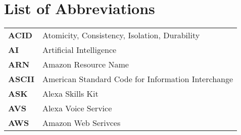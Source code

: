 \section*{List of Abbreviations}
\begin{flushleft}
\begin{tabular}{ll}



\textbf{ACID}	&	Atomicity, Consistency, Isolation, Durability\\ %
\textbf{AI}		&	Artificial Intelligence\\
\textbf{ARN}	&	Amazon Resource Name\\
\textbf{ASCII}&	American Standard Code for Information Interchange\\%
\textbf{ASK}	&	Alexa Skills Kit\\
\textbf{AVS}	&	Alexa Voice Service\\
\textbf{AWS}	&	Amazon Web Serivces\\


\end{tabular}
\end{flushleft}

